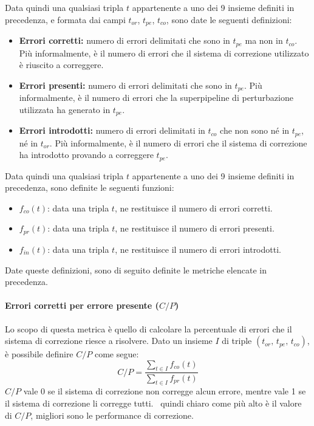 Data quindi una qualsiasi tripla $t$ appartenente a uno dei 9 insieme definiti in precedenza, e formata dai campi $t_{or}$, $t_{pe}$, $t_{co}$, sono date le seguenti definizioni:

\begin{itemize}
\item \textbf{Errori corretti:} numero di errori delimitati che sono in $t_{pe}$ ma non in $t_{co}$. Più informalmente, è il numero di errori che il sistema di correzione utilizzato è riuscito a correggere.
\item \textbf{Errori presenti:} numero di errori delimitati che sono in $t_{pe}$. Più informalmente, è il numero di errori che la superpipeline di perturbazione utilizzata ha generato in $t_{pe}$.
\item \textbf{Errori introdotti:} numero di errori delimitati in $t_{co}$ che non sono né in $t_{pe}$, né in $t_{or}$. Più informalmente, è il numero di errori che il sistema di correzione ha introdotto provando a correggere $t_{pe}$.
\end{itemize}

Data quindi una qualsiasi tripla $t$ appartenente a uno dei 9 insieme definiti in precedenza, sono definite le seguenti funzioni:
\begin{itemize}
\item $f_{co}(t)$: data una tripla $t$, ne restituisce il numero di errori corretti.
\item $f_{pr}(t)$: data una tripla $t$, ne restituisce il numero di errori presenti.
\item $f_{in}(t)$: data una tripla $t$, ne restituisce il numero di errori introdotti.
\end{itemize}
\noindent
Date queste definizioni, sono di seguito definite le metriche elencate in precedenza.


\paragraph{Errori corretti per errore presente ($C/P$)} Lo scopo di questa metrica è quello di calcolare la percentuale di errori che il sistema di correzione riesce a risolvere. Dato un insieme $I$ di triple $(\text{$t_{or}$, $t_{pe}$, $t_{co}$})$, è possibile definire $C/P$ come segue:
\begin{equation}
C/P = \frac{
    \sum_{t \in I} f_{co}(t)
}{
	\sum_{t \in I} f_{pr}(t)
}
\end{equation}
$C/P$ vale 0 se il sistema di correzione non corregge alcun errore, mentre vale 1 se il sistema di correzione li corregge tutti. \E\ quindi chiaro come più alto è il valore di $C/P$, migliori sono le performance di correzione.


